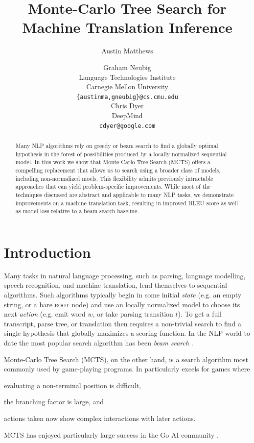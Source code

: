 \documentclass[11pt,a4paper]{article}
\title{Monte-Carlo Tree Search for Machine Translation Inference}
\author{Austin Matthews \and Graham Neubig \\
  Language Technologies Institute \\
  Carnegie Mellon University \\
  {\tt \{austinma,gneubig\}@cs.cmu.edu} \\\And
  Chris Dyer \\
  DeepMind \\
  {\tt cdyer@google.com} \\}
\date{}
\begin{document}
\maketitle

\begin{abstract}
Many NLP algorithms rely on greedy or beam search to find a globally optimal
hypothesis in the forest of possibilities produced by a locally normalized
sequential model. In this work we show that Monte-Carlo Tree Search (MCTS)
offers a compelling replacement that allows us to search using a broader class
of models, including non-normalized moels. This flexibility admits previously
intractable approaches that can yield problem-specific improvements.
While most of the techniques discussed are abstract and applicable to many NLP
tasks, we demonstrate improvements on a machine translation task, resulting in
improved BLEU score as well as model loss relative to a beam search baseline.
\end{abstract}

\section{Introduction}
\label{sec:intro}
Many tasks in natural language processing, such as parsing, language modelling,
speech recognition, and machine translation, lend themselves to sequential
algorithms. Such algorithms typically begin in some initial \emph{state} (e.g.
an empty string, or a bare \textsc{root} node) and use an locally normalized
model to choose its next \emph{action} (e.g. emit word $w$, or take parsing
transition $t$). To get a full transcript, parse tree, or translation then
requires a non-trivial search to find a single hypothesis that globally
maximizes a scoring function. In the NLP world to date the most popular search
algorithm has been \emph{beam search}
\cite[inter alia]{koehn2004pharaoh,bahdanau2014neural,vinyals2015grammar,
vaswani2017attention}.

Monte-Carlo Tree Search (MCTS), on the other hand, is a search algorithm most
commonly used by game-playing programs. In particularly excels for games where
\begin{enumerate*}[(a)]
\item evaluating a non-terminal position is difficult,
\item the branching factor is large, and 
\item actions taken now show complex interactions with later actions.
\end{enumerate*}
MCTS has enjoyed particularly large
success in the Go AI community \cite{abramson1987model, brugmann1993monte,
silver2017mastering}.
\end{document}
